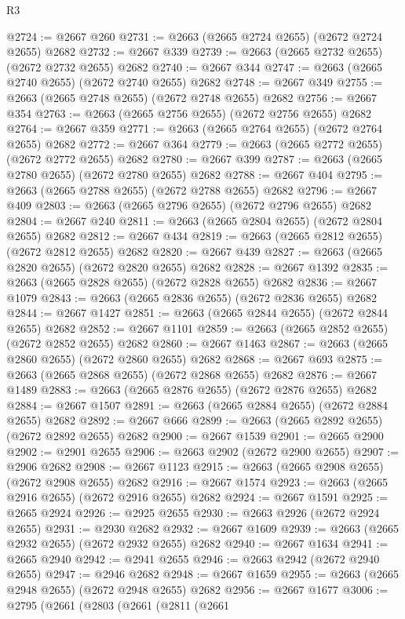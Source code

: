 \begin{lexlean}{R3}
\begin{coremodule}
@2724 := @2667 @260
@2731 := @2663 (@2665 @2724 @2655) (@2672 @2724 @2655) @2682
@2732 := @2667 @339
@2739 := @2663 (@2665 @2732 @2655) (@2672 @2732 @2655) @2682
@2740 := @2667 @344
@2747 := @2663 (@2665 @2740 @2655) (@2672 @2740 @2655) @2682
@2748 := @2667 @349
@2755 := @2663 (@2665 @2748 @2655) (@2672 @2748 @2655) @2682
@2756 := @2667 @354
@2763 := @2663 (@2665 @2756 @2655) (@2672 @2756 @2655) @2682
@2764 := @2667 @359
@2771 := @2663 (@2665 @2764 @2655) (@2672 @2764 @2655) @2682
@2772 := @2667 @364
@2779 := @2663 (@2665 @2772 @2655) (@2672 @2772 @2655) @2682
@2780 := @2667 @399
@2787 := @2663 (@2665 @2780 @2655) (@2672 @2780 @2655) @2682
@2788 := @2667 @404
@2795 := @2663 (@2665 @2788 @2655) (@2672 @2788 @2655) @2682
@2796 := @2667 @409
@2803 := @2663 (@2665 @2796 @2655) (@2672 @2796 @2655) @2682
@2804 := @2667 @240
@2811 := @2663 (@2665 @2804 @2655) (@2672 @2804 @2655) @2682
@2812 := @2667 @434
@2819 := @2663 (@2665 @2812 @2655) (@2672 @2812 @2655) @2682
@2820 := @2667 @439
@2827 := @2663 (@2665 @2820 @2655) (@2672 @2820 @2655) @2682
@2828 := @2667 @1392
@2835 := @2663 (@2665 @2828 @2655) (@2672 @2828 @2655) @2682
@2836 := @2667 @1079
@2843 := @2663 (@2665 @2836 @2655) (@2672 @2836 @2655) @2682
@2844 := @2667 @1427
@2851 := @2663 (@2665 @2844 @2655) (@2672 @2844 @2655) @2682
@2852 := @2667 @1101
@2859 := @2663 (@2665 @2852 @2655) (@2672 @2852 @2655) @2682
@2860 := @2667 @1463
@2867 := @2663 (@2665 @2860 @2655) (@2672 @2860 @2655) @2682
@2868 := @2667 @693
@2875 := @2663 (@2665 @2868 @2655) (@2672 @2868 @2655) @2682
@2876 := @2667 @1489
@2883 := @2663 (@2665 @2876 @2655) (@2672 @2876 @2655) @2682
@2884 := @2667 @1507
@2891 := @2663 (@2665 @2884 @2655) (@2672 @2884 @2655) @2682
@2892 := @2667 @666
@2899 := @2663 (@2665 @2892 @2655) (@2672 @2892 @2655) @2682
@2900 := @2667 @1539
@2901 := @2665 @2900
@2902 := @2901 @2655
@2906 := @2663 @2902 (@2672 @2900 @2655)
@2907 := @2906 @2682
@2908 := @2667 @1123
@2915 := @2663 (@2665 @2908 @2655) (@2672 @2908 @2655) @2682
@2916 := @2667 @1574
@2923 := @2663 (@2665 @2916 @2655) (@2672 @2916 @2655) @2682
@2924 := @2667 @1591
@2925 := @2665 @2924
@2926 := @2925 @2655
@2930 := @2663 @2926 (@2672 @2924 @2655)
@2931 := @2930 @2682
@2932 := @2667 @1609
@2939 := @2663 (@2665 @2932 @2655) (@2672 @2932 @2655) @2682
@2940 := @2667 @1634
@2941 := @2665 @2940
@2942 := @2941 @2655
@2946 := @2663 @2942 (@2672 @2940 @2655)
@2947 := @2946 @2682
@2948 := @2667 @1659
@2955 := @2663 (@2665 @2948 @2655) (@2672 @2948 @2655) @2682
@2956 := @2667 @1677
@3006 := @2795
    (@2661
      (@2803
        (@2661
          (@2811
            (@2661

\end{coremodule}
\end{lexlean}
